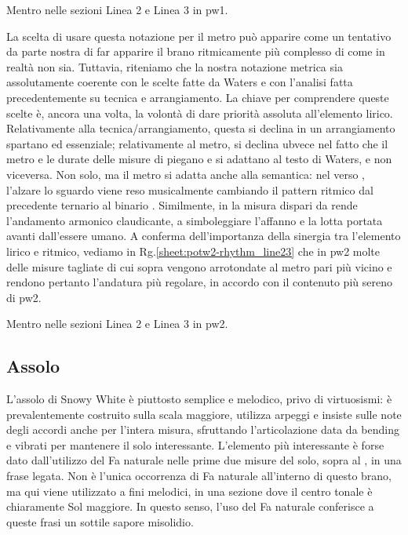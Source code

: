\documentclass[class=book, crop=false, oneside, 12pt]{standalone}
\begin{document}
    \begin{sheet}[htbp]
        \centering
        \caption{Mentro nelle sezioni Linea 2 e Linea 3 in \acrshort{pw1}.}
        \label{sheet:potw1-rhythm_line23}
    \end{sheet}
    
    La scelta di usare questa notazione per il metro può apparire come un tentativo da parte nostra di far apparire il brano ritmicamente più complesso di come in realtà non sia. Tuttavia, riteniamo che la nostra notazione metrica sia assolutamente coerente con le scelte fatte da Waters e con l'analisi fatta precedentemente su tecnica e arrangiamento. La chiave per comprendere queste scelte è, ancora una volta, la volontà di dare priorità assoluta all'elemento lirico. Relativamente alla tecnica/arrangiamento, questa si declina in un arrangiamento spartano ed essenziale; relativamente al metro, si declina ubvece nel fatto che il metro e le durate delle misure di piegano e si adattano al testo di Waters, e non viceversa. Non solo, ma il metro si adatta anche alla semantica: nel verso , l'alzare lo sguardo viene reso musicalmente cambiando il pattern ritmico dal precedente ternario  al binario . Similmente, in  la misura dispari da  rende l'andamento armonico claudicante, a simboleggiare l'affanno e la lotta portata avanti dall'essere umano. A conferma dell'importanza della sinergia tra l'elemento lirico e ritmico, vediamo in Rg.\ref{sheet:potw2-rhythm_line23} che in \acrshort{pw2} molte delle misure tagliate di cui sopra vengono arrotondate al metro pari più vicino e rendono pertanto l'andatura più regolare, in accordo con il contenuto più sereno di \acrshort{pw2}.

    \begin{sheet}[htbp]
        \centering
        \caption{Mentro nelle sezioni Linea 2 e Linea 3 in \acrshort{pw2}.}
        \label{sheet:potw2-rhythm_line23}
    \end{sheet}
    
    \subsection{Assolo}
    L'assolo di Snowy White è piuttosto semplice e melodico, privo di virtuosismi: è prevalentemente costruito sulla scala maggiore, utilizza arpeggi e insiste sulle note degli accordi anche per l'intera misura, sfruttando l'articolazione data da bending e vibrati per mantenere il solo interessante. L'elemento più interessante è forse dato dall'utilizzo del Fa naturale nelle prime due misure del solo, sopra al , in una frase legata. Non è l'unica occorrenza di Fa naturale all'interno di questo brano, ma qui viene utilizzato a fini melodici, in una sezione dove il centro tonale è chiaramente Sol maggiore. In questo senso, l'uso del Fa naturale conferisce a queste frasi un sottile sapore misolidio.
    
\end{document}
